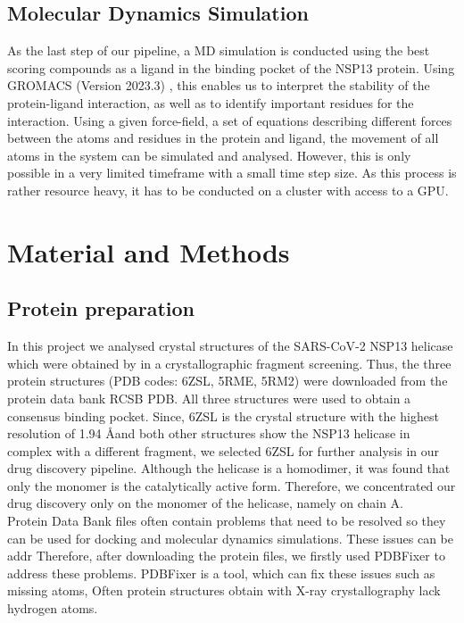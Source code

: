 \documentclass[11pt, letterpaper, titlepage]{article}
\renewcommand{\cite}{\parencite}
\begin{document}
\subsection{Molecular Dynamics Simulation}
As the last step of our pipeline, a MD simulation is conducted using the best scoring compounds as a ligand in the binding pocket of the NSP13 protein. Using GROMACS (Version 2023.3) \cite{package_GROMACS}, this enables us to interpret the stability of the protein-ligand interaction, as well as to identify important residues for the interaction. Using a given force-field, a set of equations describing different forces between the atoms and residues in the protein and ligand, the movement of all atoms in the system can be simulated and analysed. However, this is only possible in a very limited timeframe with a small time step size. As this process is rather resource heavy, it has to be conducted on a cluster with access to a GPU. 

\section{Material and Methods}
\subsection{Protein preparation}
In this project we analysed crystal structures of the SARS-CoV-2 NSP13 helicase which were obtained by \cite{Newman_2021}in a crystallographic fragment screening. Thus, the three protein structures (PDB codes: 6ZSL, 5RME, 5RM2) were downloaded from the protein data bank RCSB PDB. All three structures were used to obtain a consensus binding pocket. Since, 6ZSL is the crystal structure with the highest resolution of 1.94 \AA  and both other structures show the NSP13 helicase in complex with a different fragment, we selected 6ZSL for further analysis in our drug discovery pipeline. Although the helicase is a homodimer, it was found that only the monomer is the catalytically active form. Therefore, we concentrated our drug discovery only on the monomer of the helicase, namely on chain A. \\
Protein Data Bank files often contain problems that need to be resolved so they can be used for docking and molecular dynamics simulations. These issues can be addr
Therefore, after downloading the protein files, we firstly used PDBFixer to address these problems. PDBFixer is a tool, which can fix these issues such as missing atoms, 
Often protein structures obtain with X-ray crystallography lack hydrogen atoms. 
\end{document}
